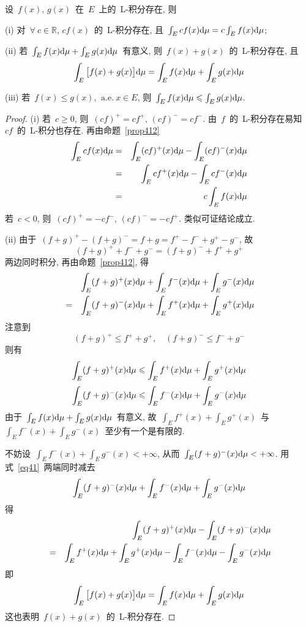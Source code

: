 \begin{proposition} \label{prop413}
设~$f(x),\, g(x)$~在~$E$~上的~L-积分存在, 则

(i) 对~$\forall~c \in \mathbb{R}$, $c f(x)$~的~L-积分存在, 且~$\int_E c f(x) \mathrm{d} \mu = c \int_E f(x) \mathrm{d} \mu$;

(ii) 若~$\int_E f(x) \mathrm{d} \mu + \int_E g(x) \mathrm{d} \mu$~有意义, 则~$f(x) + g(x)$~的~L-积分存在, 且
\[
\int_E \big[f(x) + g(x)\big] \mathrm{d} \mu = \int_E f(x) \mathrm{d} \mu + \int_E g(x) \mathrm{d} \mu
\]

(iii) 若~$f(x) \leqslant g(x),\,  \mathrm{~a.e.~} x \in E$, 则~$\int_E f(x) \mathrm{d} \mu \leqslant \int_E g(x) \mathrm{d} \mu$.
\end{proposition}

\begin{proof}
(i) 若~$c \geqslant 0$, 则~$(cf)^+ = c f^+,\, (cf)^- = c f^-$. 由~$f$~的~L-积分存在易知~$cf$~的~L-积分也存在. 再由命题~\ref{prop412}
\begin{eqnarray*}
\int_E cf(x) \mathrm{d} \mu &=& \int_E (cf)^+(x) \mathrm{d} \mu - \int_E (cf)^-(x) \mathrm{d} \mu \\
&=& \int_E c f^+(x) \mathrm{d} \mu - \int_E c f^-(x) \mathrm{d} \mu \\
&=& c \int_E f(x) \mathrm{d} \mu
\end{eqnarray*}
若~$c < 0$, 则~$(cf)^+ = -c f^-, \, (cf)^- = -c f^+$. 类似可证结论成立.

(ii) 由于~$(f+g)^+ - (f+g)^- = f + g = f^+ - f^- + g^+ - g^-$, 故
\[
(f+g)^+ + f^- + g^- = (f+g)^- + f^+ + g^+
\]
两边同时积分, 再由命题~\ref{prop412}, 得
\begin{eqnarray} \label{eq41}
&& \int_E (f+g)^+(x) \mathrm{d} \mu + \int_E f^-(x) \mathrm{d} \mu + \int_E g^-(x) \mathrm{d} \mu \nonumber \\
&=& \int_E (f+g)^-(x) \mathrm{d} \mu + \int_E f^+(x) \mathrm{d} \mu + \int_E g^+(x) \mathrm{d} \mu
\end{eqnarray}
注意到
\[
(f+g)^+ \leqslant f^+ + g^+,  \quad  (f+g)^- \leqslant f^- + g^-
\]
则有
\[
\int_E (f+g)^+(x) \mathrm{d} \mu \leqslant \int_E f^+(x) \mathrm{d} \mu + \int_E g^+(x) \mathrm{d} \mu
\]
\[
\int_E (f+g)^-(x) \mathrm{d} \mu \leqslant \int_E f^-(x) \mathrm{d} \mu + \int_E g^-(x) \mathrm{d} \mu
\]
由于~$\int_E f(x) \mathrm{d} \mu + \int_E g(x) \mathrm{d} \mu$~有意义, 故~$\int_E f^+(x) + \int_E g^+(x)$~与~$\int_E f^-(x) + \int_E g^-(x)$~至少有一个是有限的.

不妨设~$\int_E f^-(x) + \int_E g^-(x) < +\infty$, 从而~$\int_E (f+g)^-(x) \mathrm{d} \mu < +\infty$. 用式~\eqref{eq41}~两端同时减去
\[
\int_E (f+g)^-(x) \mathrm{d} \mu + \int_E f^-(x) \mathrm{d} \mu + \int_E g^-(x) \mathrm{d} \mu
\]
得
\begin{eqnarray*}
&& \int_E (f+g)^+(x) \mathrm{d} \mu - \int_E (f+g)^-(x) \mathrm{d} \mu \\
&=& \int_E f^+(x) \mathrm{d} \mu + \int_E g^+(x) \mathrm{d} \mu - \int_E f^-(x) \mathrm{d} \mu - \int_E g^-(x) \mathrm{d} \mu
\end{eqnarray*}
即
\[
\int_E \big[f(x) + g(x)\big] \mathrm{d} \mu = \int_E f(x) \mathrm{d} \mu + \int_E g(x) \mathrm{d} \mu
\]
这也表明~$f(x) + g(x)$~的~L-积分存在.


\end{proof}
